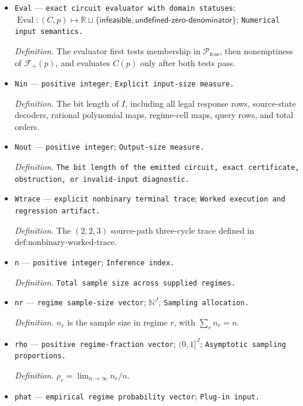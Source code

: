 \documentclass{article}
\begin{document}
\begin{itemize}
  \item \texttt{Eval} --- \texttt{exact circuit evaluator with domain statuses}; \(\operatorname{Eval}:(C,p)\mapsto\mathbb R\sqcup\{\mathsf{infeasible},\mathsf{undefined\mbox{-}zero\mbox{-}denominator}\}\); \texttt{Numerical input semantics.}
  \par\smallskip\noindent\emph{Definition.} The evaluator first tests membership in \(\mathcal P_{\mathrm{feas}}\), then nonemptiness of \(\mathcal F_+(p)\), and evaluates \(C(p)\) only after both tests pass.
  \item \texttt{Nin} --- \texttt{positive integer}; \texttt{Explicit input-\allowbreak{}size measure.}
  \par\smallskip\noindent\emph{Definition.} The bit length of \(I\), including all legal response rows, source-state decoders, rational polynomial maps, regime-cell maps, query rows, and total orders.
  \item \texttt{Nout} --- \texttt{positive integer}; \texttt{Output-\allowbreak{}size measure.}
  \par\smallskip\noindent\emph{Definition.} \texttt{The bit length of the emitted circuit,\allowbreak{} exact certificate,\allowbreak{} obstruction,\allowbreak{} or invalid-\allowbreak{}input diagnostic.}
  \item \texttt{Wtrace} --- \texttt{explicit nonbinary terminal trace}; \texttt{Worked execution and regression artifact.}
  \par\smallskip\noindent\emph{Definition.} The \((2,2,3)\) source-path three-cycle trace defined in \(\text{def:nonbinary-worked-trace}\).
  \item \texttt{n} --- \texttt{positive integer}; \texttt{Inference index.}
  \par\smallskip\noindent\emph{Definition.} \texttt{Total sample size across supplied regimes.}
  \item \texttt{nr} --- \texttt{regime sample-\allowbreak{}size vector}; \(\mathbb N^J\); \texttt{Sampling allocation.}
  \par\smallskip\noindent\emph{Definition.} \(n_r\) is the sample size in regime \(r\), with \(\sum_r n_r=n\).
  \item \texttt{rho} --- \texttt{positive regime-\allowbreak{}fraction vector}; \((0,1]^J\); \texttt{Asymptotic sampling proportions.}
  \par\smallskip\noindent\emph{Definition.} \(\rho_r=\lim_{n\to\infty}n_r/n\).
  \item \texttt{phat} --- \texttt{empirical regime probability vector}; \texttt{Plug-\allowbreak{}in input.}

\end{itemize}
\end{document}
